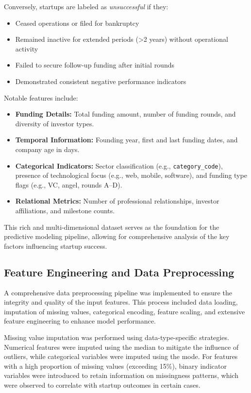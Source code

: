 \documentclass[conference]{IEEEtran}
\begin{document}
Conversely, startups are labeled as \textit{unsuccessful} if they:
\begin{itemize}
    \item Ceased operations or filed for bankruptcy
    \item Remained inactive for extended periods (>2 years) without operational activity
    \item Failed to secure follow-up funding after initial rounds
    \item Demonstrated consistent negative performance indicators
\end{itemize}

Notable features include:
\begin{itemize}
    \item \textbf{Funding Details:} Total funding amount, number of funding rounds, and diversity of investor types.
    \item \textbf{Temporal Information:} Founding year, first and last funding dates, and company age in days.
    \item \textbf{Categorical Indicators:} Sector classification (e.g., \texttt{category\_code}), presence of technological focus (e.g., web, mobile, software), and funding type flags (e.g., VC, angel, rounds A–D).
    \item \textbf{Relational Metrics:} Number of professional relationships, investor affiliations, and milestone counts.
\end{itemize}

This rich and multi-dimensional dataset serves as the foundation for the predictive modeling pipeline, allowing for comprehensive analysis of the key factors influencing startup success.
\subsection{Feature Engineering and Data Preprocessing}

A comprehensive data preprocessing pipeline was implemented to ensure the integrity and quality of the input features. This process included data loading, imputation of missing values, categorical encoding, feature scaling, and extensive feature engineering to enhance model performance.

Missing value imputation was performed using data-type-specific strategies. Numerical features were imputed using the median to mitigate the influence of outliers, while categorical variables were imputed using the mode. For features with a high proportion of missing values (exceeding 15\%), binary indicator variables were introduced to retain information on missingness patterns, which were observed to correlate with startup outcomes in certain cases.
\end{document}
